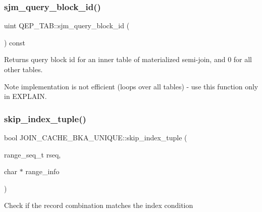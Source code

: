 \subsubsection{\texorpdfstring{sjm\+\_\+query\+\_\+block\+\_\+id()}{sjm\_query\_block\_id()}}
{\footnotesize\ttfamily uint Q\+E\+P\+\_\+\+T\+A\+B\+::sjm\+\_\+query\+\_\+block\+\_\+id (\begin{DoxyParamCaption}{ }\end{DoxyParamCaption}) const}

\begin{DoxyReturn}{Returns}
query block id for an inner table of materialized semi-\/join, and 0 for all other tables. 
\end{DoxyReturn}
\begin{DoxyNote}{Note}
implementation is not efficient (loops over all tables) -\/ use this function only in E\+X\+P\+L\+A\+IN. 
\end{DoxyNote}
\mbox{\label{group__Query__Optimizer_ga6afa1e2231c8090ecae73554fca37c41}} 
\subsubsection{\texorpdfstring{skip\+\_\+index\+\_\+tuple()}{skip\_index\_tuple()}}
{\footnotesize\ttfamily bool J\+O\+I\+N\+\_\+\+C\+A\+C\+H\+E\+\_\+\+B\+K\+A\+\_\+\+U\+N\+I\+Q\+U\+E\+::skip\+\_\+index\+\_\+tuple (\begin{DoxyParamCaption}\item[{range\+\_\+seq\+\_\+t}]{rseq,  }\item[{char $\ast$}]{range\+\_\+info }\end{DoxyParamCaption})}

Check if the record combination matches the index condition


